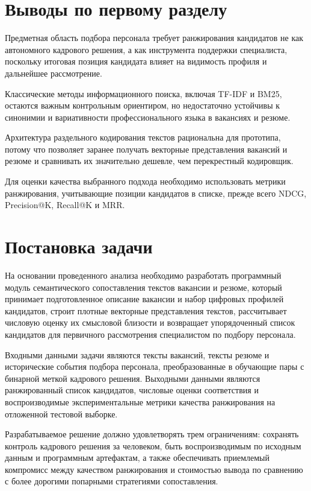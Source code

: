 \section{Выводы по первому разделу}
\begin{compactenum}
  \item Предметная область подбора персонала требует ранжирования кандидатов не как автономного кадрового решения, а как инструмента поддержки специалиста, поскольку итоговая позиция кандидата влияет на видимость профиля и дальнейшее рассмотрение.
  \item Классические методы информационного поиска, включая TF-IDF и BM25, остаются важным контрольным ориентиром, но недостаточно устойчивы к синонимии и вариативности профессионального языка в вакансиях и резюме.
  \item Архитектура раздельного кодирования текстов рациональна для прототипа, потому что позволяет заранее получать векторные представления вакансий и резюме и сравнивать их значительно дешевле, чем перекрестный кодировщик.
  \item Для оценки качества выбранного подхода необходимо использовать метрики ранжирования, учитывающие позиции кандидатов в списке, прежде всего NDCG, Precision@K, Recall@K и MRR.
\end{compactenum}
\section{Постановка задачи}
На основании проведенного анализа необходимо разработать программный модуль семантического сопоставления текстов вакансии и резюме, который принимает подготовленное описание вакансии и набор цифровых профилей кандидатов, строит плотные векторные представления текстов, рассчитывает числовую оценку их смысловой близости и возвращает упорядоченный список кандидатов для первичного рассмотрения специалистом по подбору персонала.\par
Входными данными задачи являются тексты вакансий, тексты резюме и исторические события подбора персонала, преобразованные в обучающие пары с бинарной меткой кадрового решения. Выходными данными являются ранжированный список кандидатов, числовые оценки соответствия и воспроизводимые экспериментальные метрики качества ранжирования на отложенной тестовой выборке.\par
Разрабатываемое решение должно удовлетворять трем ограничениям: сохранять контроль кадрового решения за человеком, быть воспроизводимым по исходным данным и программным артефактам, а также обеспечивать приемлемый компромисс между качеством ранжирования и стоимостью вывода по сравнению с более дорогими попарными стратегиями сопоставления.\par
